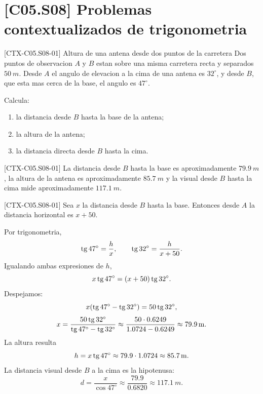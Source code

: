 \section{[C05.S08] Problemas contextualizados de trigonometria}

\begin{exercise}{[CTX-C05.S08-01] Altura de una antena desde dos puntos de la carretera}
Dos puntos de observacion \(A\) y \(B\) estan sobre una misma carretera recta y separados
\(\SI{50}{m}\). Desde \(A\) el angulo de elevacion a la cima de una antena es \(32^\circ\), y
desde \(B\), que esta mas cerca de la base, el angulo es \(47^\circ\).

Calcula:
\begin{enumerate}
  \item la distancia desde \(B\) hasta la base de la antena;
  \item la altura de la antena;
  \item la distancia directa desde \(B\) hasta la cima.
\end{enumerate}
\end{exercise}

\begin{shortanswer}{[CTX-C05.S08-01]}
La distancia desde \(B\) hasta la base es aproximadamente \(\SI{79.9}{m}\), la altura de la
antena es aproximadamente \(\SI{85.7}{m}\) y la visual desde \(B\) hasta la cima mide
aproximadamente \(\SI{117.1}{m}\).
\end{shortanswer}

\begin{fullsolution}{[CTX-C05.S08-01]}
Sea \(x\) la distancia desde \(B\) hasta la base. Entonces desde \(A\) la distancia horizontal
es \(x+50\).

Por trigonometria,
\[
\operatorname{tg} 47^\circ=\frac{h}{x},
\qquad
\operatorname{tg} 32^\circ=\frac{h}{x+50}.
\]
Igualando ambas expresiones de \(h\),
\[
x\operatorname{tg} 47^\circ=(x+50)\operatorname{tg} 32^\circ.
\]
Despejamos:
\[
x(\operatorname{tg} 47^\circ-\operatorname{tg} 32^\circ)=50\operatorname{tg} 32^\circ,
\]
\[
x=\frac{50\operatorname{tg} 32^\circ}{\operatorname{tg} 47^\circ-\operatorname{tg} 32^\circ}
\approx \frac{50\cdot 0.6249}{1.0724-0.6249}\approx \SI{79.9}{m}.
\]
La altura resulta
\[
h=x\operatorname{tg} 47^\circ\approx 79.9\cdot 1.0724\approx \SI{85.7}{m}.
\]
La distancia visual desde \(B\) a la cima es la hipotenusa:
\[
d=\frac{x}{\cos 47^\circ}\approx \frac{79.9}{0.6820}\approx \SI{117.1}{m}.
\]
\end{fullsolution}

